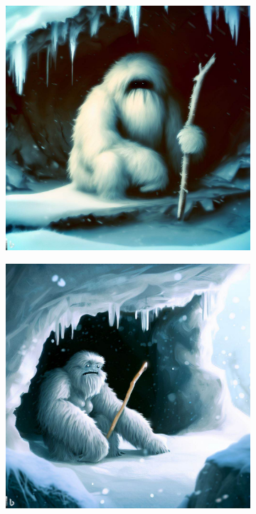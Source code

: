 \documentclass[11pt, twoside]{article}
\begin{document}
\begin{figure}[H]
\begin{subfigure}{0.3\textwidth}
    \includegraphics[width=0.99\linewidth]{yeti2.jpeg}
  \end{subfigure}%
  \begin{subfigure}{0.3\textwidth}
    \centering
    \includegraphics[width=0.99\linewidth]{yeti3.jpeg}
  \end{subfigure}
\end{figure}
\end{document}
